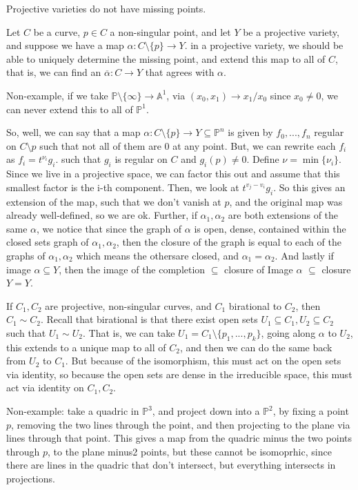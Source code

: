 \documentclass[10pt]{article}
\begin{document}
Projective varieties do not have missing points.

Let $C$ be a curve, $p \in C$ a non-singular point, and let $Y$ be a projective variety, and suppose we have a map $\alpha: C \setminus \{ p \} \to Y$. in a projective variety, we should be able to uniquely determine the missing point, and extend this map to all of $C$, that is, we can find an $\overline{\alpha}: C \to Y$ that agrees with $\alpha$. 

Non-example, if we take $\mathbb{P} \setminus \{ \infty \} \to \mathbb{A}^1$, via $(x_0,x_1) \to x_1/x_0$ since $x_0 \not = 0$, we can never extend this to all of $\mathbb{P}^1$. 

So, well, we can say that a map $\alpha: C \setminus \{ p \} \to Y \subseteq \mathbb{P}^n$ is given by $f_0,...,f_n$ regular on $C \setminus p$ such that not all of them are 0 at any point. But, we can rewrite each $f_i$ as $f_i = t^{\nu_i} g_i$. such that $g_i$ is regular on $C$ and $g_i(p)\not = 0$. Define $\nu = \min \{ \nu_i \}$. Since we live in a projective space, we can factor this out and assume that this smallest factor is the i-th component. Then, we look at $t^{v_j - v_i} g_i$. So this gives an extension of the map, such that we don’t vanish at $p$, and the original map was already well-defined, so we are ok. Further, if $\alpha_1, \alpha_2$ are both extensions of the same $\alpha$, we notice that since the graph of $\alpha$ is open, dense, contained within the closed sets graph of $\alpha_1,\alpha_2$, then the closure of the graph is equal to each of the graphs of $\alpha_1,\alpha_2$ which means the othersare closed, and $\alpha_1 = \alpha_2$. And lastly if image $\alpha \subseteq Y$, then the image of the completion $\subseteq$ closure of Image $\alpha$ $\subseteq$ closure $Y = Y$.

If $C_1,C_2$ are projective, non-singular curves, and $C_1$ birational to $C_2$, then $C_1 \sim C_2$. Recall that birational is that there exist open sets $U_1 \subseteq C_1, U_2 \subseteq C_2$ such that $U_1 \sim U_2$. That is, we can take $U_1 = C_1 \setminus \{ p_1,...,p_k\}$, going along $\alpha$ to $U_2$, this extends to a unique map to all of $C_2$, and then we can do the same back from $U_2$ to $C_1$. But because of the isomorphism, this must act on the open sets via identity, so because the open sets are dense in the irreducible space, this must act via identity on $C_1,C_2$.

Non-example: take a quadric in $\mathbb{P}^3$, and project down into a $\mathbb{P}^2$, by fixing a point $p$, removing the two lines through the point, and then projecting to the plane via lines through that point. This gives a map from the quadric minus the two points through $p$, to the plane minus2 points, but these cannot be isomoprhic, since there are lines in the quadric that don’t intersect, but everything intersects in projections.
\end{document}
